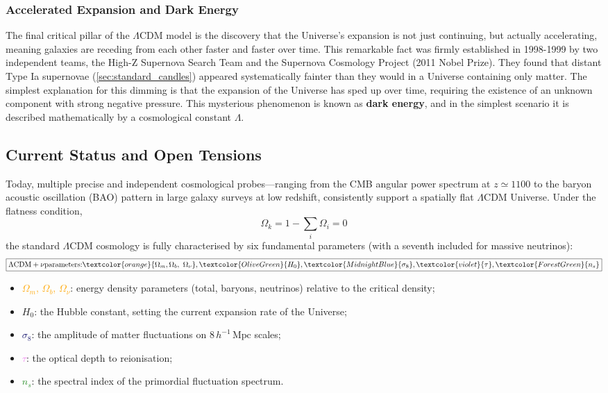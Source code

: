 \subsubsection{Accelerated Expansion and Dark Energy} \label{subsec:dark_energy_discovery}

The final critical pillar of the $\Lambda$CDM model is the discovery that the Universe's expansion is not just continuing, but actually accelerating, meaning galaxies are receding from each other faster and faster over time. This remarkable fact was firmly established in 1998-1999 by two independent teams, the High-Z Supernova Search Team and the Supernova Cosmology Project (2011 Nobel Prize). They found that distant Type Ia supernovae (\cref{sec:standard_candles}) appeared systematically fainter than they would in a Universe containing only matter. The simplest explanation for this dimming is that the expansion of the Universe has sped up over time, requiring the existence of an unknown component with strong negative pressure. This mysterious phenomenon is known as \textbf{dark energy}, and in the simplest scenario it is described mathematically by a cosmological constant $\Lambda$.

\subsection{Current Status and Open Tensions} \label{subsec:lcdm_status}

Today, multiple precise and independent cosmological probes—ranging from the CMB angular power spectrum at $z \simeq 1100$ to the baryon acoustic oscillation (BAO) pattern in large galaxy surveys at low redshift, consistently support a spatially flat $\Lambda$CDM Universe. Under the flatness condition,
$$
\Omega_k = 1 - \sum_i \Omega_i = 0
$$
the standard $\Lambda$CDM cosmology is fully characterised by six fundamental parameters (with a seventh included for massive neutrinos):
$$
\boxed{
    \Lambda\mathrm{CDM}+\nu \text{parameters:}
    \textcolor{orange}{\Omega_m, \Omega_b,~\Omega_\nu},
    \textcolor{OliveGreen}{H_0},
    \textcolor{MidnightBlue}{\sigma_8},
    \textcolor{violet}{\tau},
    \textcolor{ForestGreen}{n_s}
}
$$

\begin{itemize}
    \item \textcolor{orange}{$\Omega_m$, $\Omega_b$, $\Omega_\nu$}: energy density parameters (total, baryons, neutrinos) relative to the critical density;
    \item \textcolor{OliveGreen}{$H_0$}: the Hubble constant, setting the current expansion rate of the Universe;
    \item \textcolor{MidnightBlue}{$\sigma_8$}: the amplitude of matter fluctuations on $8\,h^{-1}\,\text{Mpc}$ scales;
    \item \textcolor{violet}{$\tau$}: the optical depth to reionisation;
    \item \textcolor{ForestGreen}{$n_s$}: the spectral index of the primordial fluctuation spectrum.
\end{itemize}

